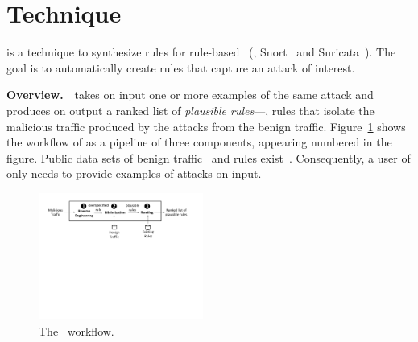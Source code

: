 \documentclass[sigconf,review, anonymous]{acmart}
\begin{document}
\section{Technique}
\label{sec:technique}

\tname{} is a technique to synthesize rules for rule-based
\nids~(\eg{}, Snort~\cite{snort} and Suricata~\cite{suricata}). The
goal is to automatically create rules that capture an attack of
interest.

\vspace{1ex}
\noindent\textbf{Overview.}~\tname\ takes on input one or more
examples of the same attack and produces on output a ranked list of
\emph{plausible rules}---\ie{}, rules that isolate the malicious
traffic produced by the attacks from the benign
traffic. Figure~\ref{fig:overview} shows the workflow of \tname{} as a
pipeline of three components, appearing numbered in the figure.
Public data sets of benign
traffic~\cite{tcpreplay,stratosphere-normal} and rules
exist~\cite{emerging-threats-open}. Consequently, a user of \tname{}
only needs to provide examples of attacks on input.


\begin{figure}[t!]
  \centering
  \includegraphics[trim=0 395 50 0,clip,width=0.48\textwidth]{figs/nids-workflow}
  \vspace{-4ex}  
  \caption{The \tname\ workflow.}
  \label{fig:overview}
  \vspace{-3ex}
\end{figure}
\end{document}
